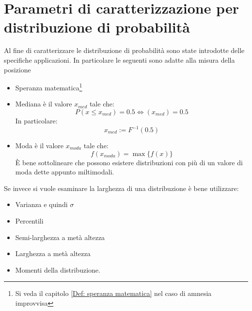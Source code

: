 \documentclass[11pt,a4paper]{book}
\begin{document}
\section[Parametri di caratterizzazione]{Parametri di caratterizzazione per distribuzione di probabilità} 
Al fine di caratterizzare le distribuzione di probabilità sono state introdotte delle specifiche applicazioni. In particolare le seguenti sono adatte alla misura della posizione
\begin{itemize}
\item Speranza matematica\footnote{Si veda il capitolo \ref{Def: speranza matematica} nel caso di amnesia improvvisa}
\item Mediana è il valore $ x_{med} $ tale che:
\begin{equation}
P(x \leq x_{med}) = 0.5 \Leftrightarrow (x_{med}) = 0.5
\end{equation}
In particolare:
\begin{equation}
x_{med} := F^{-1}(0.5)
\end{equation}
\item Moda è il valore $ x_{moda} $ tale che:
\begin{equation}
f(x_{moda}) = \max\{f(x)\}
\end{equation}
\`{E} bene sottolineare che possono esistere distribuzioni con più di un valore di moda dette appunto miltimodali.
\end{itemize}
Se invece si vuole esaminare la larghezza di una distribuzione è bene utilizzare:
\begin{itemize}
\item Varianza e quindi $ \sigma $
\item Percentili
\item Semi-larghezza a metà altezza 
\item Larghezza a metà altezza
\item Momenti della distribuzione.
\end{itemize}
\end{document}

